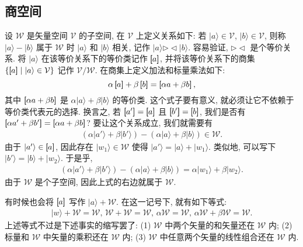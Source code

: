 \documentclass[lang=cn,zihao=-4,twoside,fontset=none]{textbook}
\newcommand{\equivclass}[1]{\left[\hspace{-3pt}\left[#1\right]\hspace{-2.5pt}\right]}
\def\eq#1{\[\begin{aligned}{}#1\end{aligned}\]}
\renewcommand{\ket}[1]{| #1 \rangle}
\begin{document}
\subsection{商空间}\label{sec:2.1.2}

设 $\mathcal W$ 是矢量空间 $\mathcal V$ 的子空间, 在 $\mathcal V$ 上定义关系如下: 若 $|a\rangle\in\mathcal V$, $|b\rangle \in\mathcal V$, 则称 $|a\rangle-|b\rangle$ 属于 $\mathcal W$ 时 $|a\rangle$ 和 $|b\rangle$ 相关, 记作 $|a\rangle\mathrel{\triangleright\!\triangleleft} |b\rangle$. 容易验证, $\mathrel{\triangleright\!\triangleleft}$ 是个等价关系. 将 $|a\rangle$ 在该等价关系下的等价类记作 $\equivclass{a}$, 并将该等价关系下的商集 $\{\equivclass{a}\mid |a\rangle \in\mathcal V\}$ 记作 $\mathcal V/\mathcal W$. 在商集上定义加法和标量乘法如下:
\begin{equation}
    \alpha\equivclass{a}+\beta\equivclass{b}=\equivclass{\alpha a+\beta b}, \label{eq:2.1}
\end{equation}
其中 $\equivclass{\alpha a+\beta b}$ 是 $\alpha\ket{a}+\beta\ket{b}$ 的等价类. 这个式子要有意义, 就必须让它不依赖于等价类代表元的选择. 换言之, 若 $\equivclass{a'}=\equivclass{a}$ 且 $\equivclass{b'}=\equivclass{b}$, 我们是否有 $\equivclass{\alpha a'+\beta b'}=\equivclass{\alpha a+\beta b}$? 要让这个关系成立, 我们就需要有
\eq{
    (\alpha\ket{a'}+\beta\ket{b'})-(\alpha\ket{a}+\beta\ket{b})\in\mathcal W. 
}
由于 $\ket{a'}\in\equivclass{a}$, 因此存在 $\ket{w_1}\in\mathcal W$ 使得 $\ket{a'}=\ket{a}+\ket{w_1}$. 类似地, 可以写下 $\ket{b'}=\ket{b}+\ket{w_2}$. 于是乎,
\eq{
    (\alpha\ket{a'}+\beta\ket{b'})-(\alpha\ket{a}+\beta\ket{b})=\alpha\ket{w_1}+\beta\ket{w_2}.
}
由于 $\mathcal W$ 是个子空间, 因此上式的右边就属于 $\mathcal W$.

有时候也会将 $\equivclass{a}$ 写作 $\ket{a}+\mathcal W$. 在这一记号下, 就有如下等式:
\eq{
    \ket{w}+\mathcal W=\mathcal W,\, \mathcal{W}+\mathcal W = \mathcal W, \, \alpha \mathcal W = \mathcal W, \, \alpha\mathcal W+\beta \mathcal W = \mathcal W.
}
上述等式不过是下述事实的缩写罢了: (1) $\mathcal W$ 中两个矢量的和矢量还在 $\mathcal W$ 内; (2) 标量和 $\mathcal W$ 中矢量的乘积还在 $\mathcal W$ 内; (3) $\mathcal W$ 中任意两个矢量的线性组合还在 $\mathcal W$ 内. 
\end{document}
